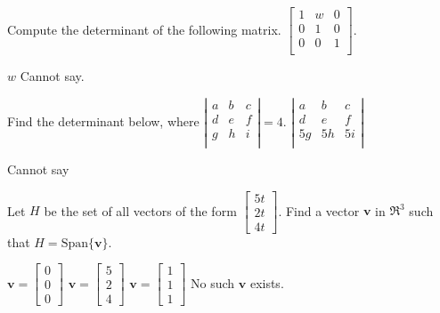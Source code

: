 \documentclass[11pt]{exam}
\begin{document}
\begin{questions}
\addpoints
\question[2] Compute the determinant of the following matrix. \newline
$\left[\begin{array}{ccc}1 & w & 0 \\ 0 & 1 & 0 \\ 0 & 0 & 1 \\ \end{array}\right]$.

\begin{oneparchoices}
\choice $w$
\choice Cannot say.
\end{oneparchoices}
\answerline

\addpoints
\question[2]
Find the determinant below, where $\left|\begin{array}{ccc}a & b & c \\ d & e & f \\ g & h & i \\ \end{array}\right|=4$. \newline
$\left|\begin{array}{ccc}a & b & c \\ d & e & f \\ 5g & 5h & 5i \\ \end{array}\right|$

\begin{oneparchoices}
\choice Cannot say
\end{oneparchoices}
\answerline

\addpoints
\question[2]
Let $H$ be the set of all vectors of the form $\left[\begin{array}{c}5t \\ 2t \\ 4t \end{array}\right]$. Find a vector $\mathbf{v}$ in $\Re^{3}$ such that $H=\text{Span}\{{\mathbf{v}}\}$.

\begin{oneparchoices}
\choice $\mathbf{v} = \left[\begin{array}{c}0 \\ 0 \\ 0 \end{array}\right]$
\choice $\mathbf{v} = \left[\begin{array}{c}5 \\ 2 \\ 4 \end{array}\right]$ %
\choice $\mathbf{v} = \left[\begin{array}{c}1 \\ 1 \\ 1 \end{array}\right]$
\choice No such $\mathbf{v}$ exists.
\end{oneparchoices}
\answerline


\end{questions}
\end{document}
